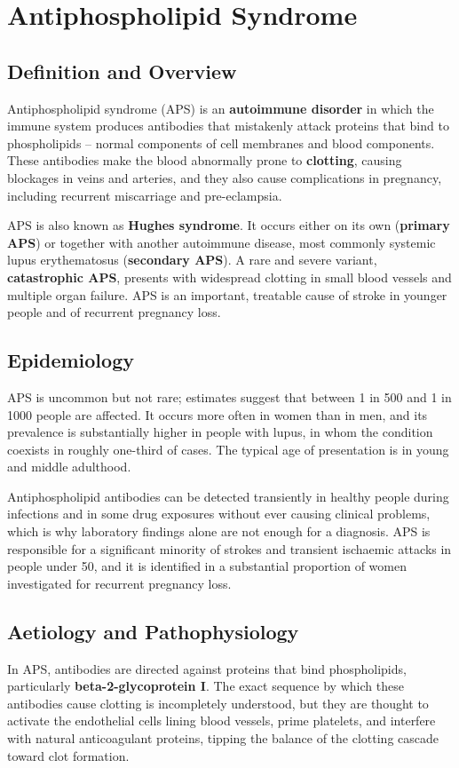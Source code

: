 \chapter{Antiphospholipid Syndrome}

\section*{Definition and Overview}
Antiphospholipid syndrome (APS) is an \textbf{autoimmune disorder} in which the immune system produces antibodies that mistakenly attack proteins that bind to phospholipids -- normal components of cell membranes and blood components. These antibodies make the blood abnormally prone to \textbf{clotting}, causing blockages in veins and arteries, and they also cause complications in pregnancy, including recurrent miscarriage and pre-eclampsia.

APS is also known as \textbf{Hughes syndrome}. It occurs either on its own (\textbf{primary APS}) or together with another autoimmune disease, most commonly systemic lupus erythematosus (\textbf{secondary APS}). A rare and severe variant, \textbf{catastrophic APS}, presents with widespread clotting in small blood vessels and multiple organ failure. APS is an important, treatable cause of stroke in younger people and of recurrent pregnancy loss.

\section*{Epidemiology}
APS is uncommon but not rare; estimates suggest that between 1 in 500 and 1 in 1000 people are affected. It occurs more often in women than in men, and its prevalence is substantially higher in people with lupus, in whom the condition coexists in roughly one-third of cases. The typical age of presentation is in young and middle adulthood.

Antiphospholipid antibodies can be detected transiently in healthy people during infections and in some drug exposures without ever causing clinical problems, which is why laboratory findings alone are not enough for a diagnosis. APS is responsible for a significant minority of strokes and transient ischaemic attacks in people under 50, and it is identified in a substantial proportion of women investigated for recurrent pregnancy loss.

\section*{Aetiology and Pathophysiology}
In APS, antibodies are directed against proteins that bind phospholipids, particularly \textbf{beta-2-glycoprotein I}. The exact sequence by which these antibodies cause clotting is incompletely understood, but they are thought to activate the endothelial cells lining blood vessels, prime platelets, and interfere with natural anticoagulant proteins, tipping the balance of the clotting cascade toward clot formation.

